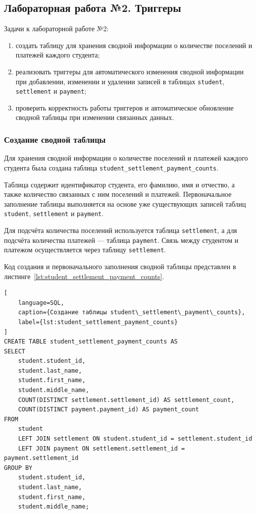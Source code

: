 \newpage
\subsection{Лабораторная работа №2. Триггеры}

Задачи к лабораторной работе №2:

\begin{enumerate}
\item создать таблицу для хранения сводной информации о количестве поселений и платежей каждого студента; 
\item реализовать триггеры для автоматического изменения сводной информации при добавлении, изменении и удалении записей в таблицах \texttt{student}, \texttt{settlement} и \texttt{payment}; 
\item проверить корректность работы триггеров и автоматическое обновление сводной таблицы при изменении связанных данных.
\end{enumerate}

\subsubsection{Создание сводной таблицы}

Для хранения сводной информации о количестве поселений и платежей каждого студента была создана таблица \texttt{\small student\_settlement\_payment\_counts}.

Таблица содержит идентификатор студента, его фамилию, имя и отчество, а также количество связанных с ним поселений и платежей. Первоначальное заполнение таблицы выполняется на основе уже существующих записей таблиц \texttt{student}, \texttt{settlement} и \texttt{payment}.

Для подсчёта количества поселений используется таблица \texttt{settlement}, а для подсчёта количества платежей --- таблица \texttt{payment}. Связь между студентом и платежом осуществляется через таблицу \texttt{settlement}.

Код создания и первоначального заполнения сводной таблицы представлен в листинге~\ref{lst:student_settlement_payment_counts}.

\begin{lstlisting}[
    language=SQL,
    caption={Создание таблицы student\_settlement\_payment\_counts},
    label={lst:student_settlement_payment_counts}
]
CREATE TABLE student_settlement_payment_counts AS
SELECT
    student.student_id,
    student.last_name,
    student.first_name,
    student.middle_name,
    COUNT(DISTINCT settlement.settlement_id) AS settlement_count,
    COUNT(DISTINCT payment.payment_id) AS payment_count
FROM
    student
    LEFT JOIN settlement ON student.student_id = settlement.student_id
    LEFT JOIN payment ON settlement.settlement_id = payment.settlement_id
GROUP BY
    student.student_id,
    student.last_name,
    student.first_name,
    student.middle_name;
\end{lstlisting}


